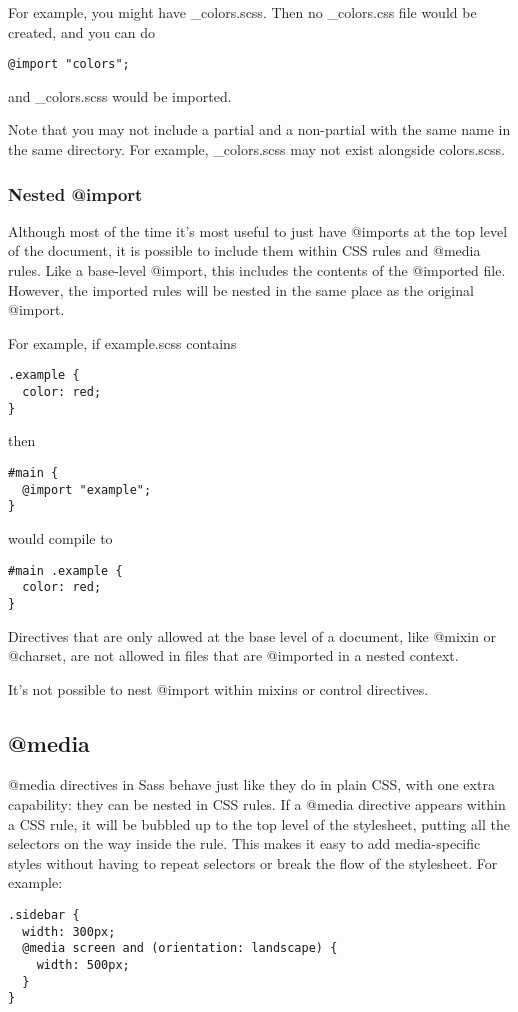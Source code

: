 \documentclass[10pt]{article}
\begin{document}
 For example, you might have \_colors.scss. Then no \_colors.css file would be created, and you can do
\begin{verbatim}
@import "colors";
\end{verbatim}


 and \_colors.scss would be imported.


 Note that you may not include a partial and a non-partial with the same name in the same directory. For example, \_colors.scss may not exist alongside colors.scss.
\subsubsection{Nested @import}


 Although most of the time it’s most useful to just have @imports at the top level of the document, it is possible to include them within CSS rules and @media rules. Like a base-level @import, this includes the contents of the @imported file. However, the imported rules will be nested in the same place as the original @import.


 For example, if example.scss contains
\begin{verbatim}
.example {
  color: red;
}
\end{verbatim}


 then
\begin{verbatim}
#main {
  @import "example";
}
\end{verbatim}


 would compile to
\begin{verbatim}
#main .example {
  color: red;
}
\end{verbatim}


 Directives that are only allowed at the base level of a document, like @mixin or @charset, are not allowed in files that are @imported in a nested context.


 It’s not possible to nest @import within mixins or control directives.
\subsection{@media}


 @media directives in Sass behave just like they do in plain CSS, with one extra capability: they can be nested in CSS rules. If a @media directive appears within a CSS rule, it will be bubbled up to the top level of the stylesheet, putting all the selectors on the way inside the rule. This makes it easy to add media-specific styles without having to repeat selectors or break the flow of the stylesheet. For example:
\begin{verbatim}
.sidebar {
  width: 300px;
  @media screen and (orientation: landscape) {
    width: 500px;
  }
}
\end{verbatim}
\end{document}
